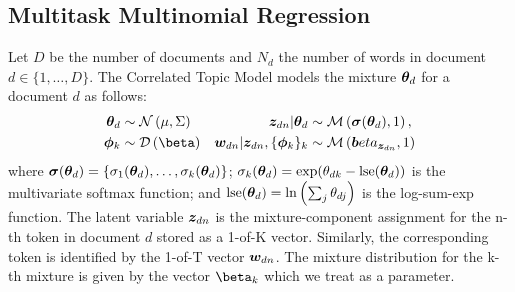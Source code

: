 %
%
%
%

\subsection{Multitask Multinomial Regression}
Let $D$ be the number of documents and $N_d$ the number of words in document $d\in\{1,\ldots,D\}$. The Correlated Topic Model models the mixture ${ \bm \theta_d }$ for a document $d$ as follows:
\begin{align}
\thd &\sim \nor{\mu}{\Sigma}
&\zdn | \thd &\sim \muln {\vv{\sigma}(\thd)}{1} ,\\
\pk &\sim\dir{\vv{\beta}}
&\wdn | \zdn , \{\pk\}_k &\sim \muln{\vv{beta}_{\zdn}}{1}
\end{align}
where $\bm \sigma({ \bm \theta_d }) = \{\sigma_1({ \bm \theta_d }), \ldots, \sigma_k({ \bm \theta_d })\}$; $\sigma_k({ \bm \theta_d }) = \exp({ \theta_{dk} } - \text{lse}({ \bm \theta_d }))$ is the multivariate softmax function; and $\text{lse}({ \bm \theta_d }) = \ln\left(\sum_j { \theta_{dj} } \right)$ is the log-sum-exp function. The latent variable ${ \bm z_{dn} }$ is the mixture-component assignment for the n-th token in document $d$ stored as a 1-of-K vector. Similarly, the corresponding token is identified by the 1-of-T vector ${ \bm w_{dn} }$. The mixture distribution for the k-th mixture is given by the vector $\vv{\beta}_k$ which we treat as a parameter.

